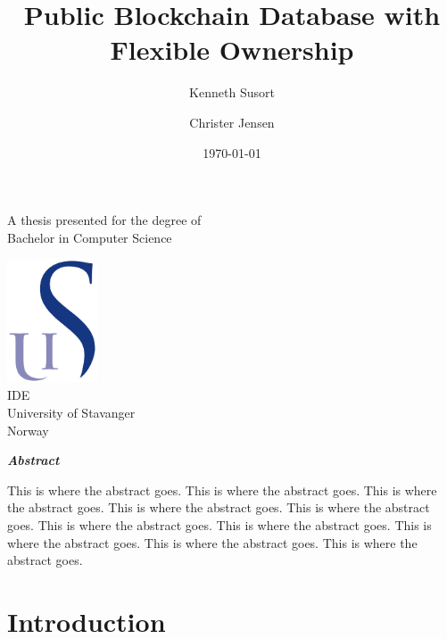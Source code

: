 \documentclass[12pt]{article}
\title{Public Blockchain Database with Flexible Ownership}
\author{Kenneth Susort \and Christer Jensen}
\date{\today}
\begin{document}

\begin{titlepage}
 \begin{center}
  
  \huge
  \textbf{\thetitle}
  
  \vspace{1.5cm}
  
  \textbf{\large\theauthor}
  
  \vfill
  
  {\Large A thesis presented for the degree of\\
  Bachelor in Computer Science}
  
  \vspace{0.8cm}
  
  \includegraphics[width=0.2\textwidth]{university_logo.png}\\
  \large
  IDE\\
  University of Stavanger\\
  Norway\\
  \thedate
  
 \end{center}
\end{titlepage}


\begin{center}
 \vspace*{4cm}
 \textbf{\textit{Abstract}}
\end{center}

This is where the abstract goes. This is where the abstract goes. This is where the abstract goes. This is where the abstract goes. This is where the abstract goes. This is where the abstract goes. This is where the abstract goes. This is where the abstract goes. This is where the abstract goes. This is where the abstract goes.
\newpage

\tableofcontents

\newpage
{}
\setcounter{page}{\theCurrentPage}

\section{Introduction}
\end{document}
